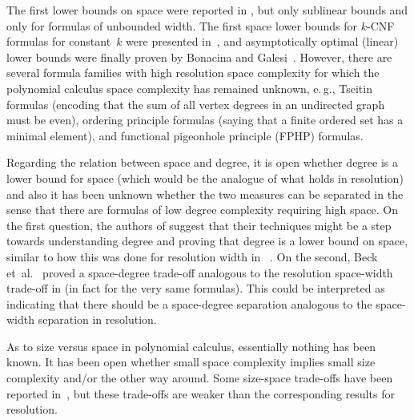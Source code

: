 \documentclass[11pt]{article}
\numberwithin{equation}{section}
\theoremstyle{definition}
\theoremstyle{plain}
\newcommand{\eg}{e.\,g.}
\providecommand{\etal}{et~al.}
\begin{document}
The first lower bounds on space were reported in
\cite{ABRW02SpaceComplexity},
but only sublinear bounds and only for
formulas of unbounded width. The first space lower bounds for
\mbox{$k$-CNF} formulas
%
%
for constant~$k$ were presented in~\cite{FLNRT15SpaceCplx},
and asymptotically optimal (linear) lower bounds
were finally proven by
Bonacina and Galesi~\cite{BG15Framework}.
However, there are several formula families with high resolution space complexity
for which the 
%
polynomial calculus   
space complexity has remained unknown,
%
\eg,     %
Tseitin formulas (encoding
%
that the sum of all vertex
degrees in an undirected graph must be even), 
ordering principle formulas
%
(saying that a finite ordered set has a minimal element),
and 
%
functional pigeonhole principle (FPHP) formulas.

Regarding the relation between space and degree, it is open whether
degree is a lower bound for space 
(which would be the analogue of what holds in resolution)
and also it has been unknown whether the two
measures can be separated in the sense that there are formulas of low
degree complexity requiring high space.
%
On the first question, the authors of \cite{BG15Framework} suggest
that their techniques might be a step towards understanding degree and
proving that degree %
is a lower bound on  %
space, similar to how this was done
for resolution width in~%
\cite{AD08CombinatoricalCharacterization}.
%
On the second, Beck \etal~\cite{BNT13SomeTradeoffs} proved a
space-degree trade-off analogous to the resolution space-width
trade-off in \cite{Ben-Sasson09SizeSpaceTradeoffs} (in fact for the
very same formulas).  This
%
could be interpreted as indicating that there should be a space-degree
separation analogous to the space-width separation in resolution.


As to size versus space in 
%
polynomial calculus,   
essentially nothing has been known.
It 
%
has been 
open whether small space complexity implies small size
complexity and/or the other way around.
Some size-space trade-offs 
%
%
have been
reported in~\cite{BNT13SomeTradeoffs,HN12VirtueSuccinctProofs},
but these trade-offs are weaker than the corresponding results for
resolution. 

\label{sec:intro-our-results}
\end{document}
